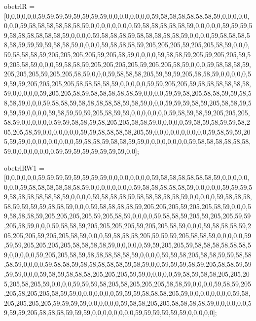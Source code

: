 obetrlR = [0,0,0,0,0,0,59,59,59,59,59,59,59,59,0,0,0,0,0,0,0,0,59,58,58,58,58,58,58,59,0,0,0,0,0,0,0,0,59,58,58,58,58,58,58,59,0,0,0,0,0,0,0,0,59,58,58,58,58,58,59,0,0,0,0,0,59,59,59,59,58,58,58,58,58,58,59,0,0,0,0,59,58,58,58,59,58,58,58,58,58,59,0,0,0,0,59,58,58,58,58,58,59,59,59,59,58,58,59,0,0,0,0,59,58,58,58,59,205,205,205,59,205,205,58,59,0,0,0,59,58,58,58,59,205,205,205,205,59,205,58,59,0,0,0,0,59,58,58,59,205,59,205,205,59,59,205,58,59,0,0,0,59,58,58,59,205,205,205,205,59,205,205,58,59,0,0,0,59,58,58,58,59,205,205,205,59,205,205,58,59,0,0,0,59,58,58,58,205,59,59,59,205,58,58,59,0,0,0,0,0,59,59,59,205,205,205,205,58,58,58,58,59,0,0,0,0,0,59,59,205,205,59,58,58,58,58,58,58,59,0,0,0,0,0,59,205,205,58,59,58,58,58,58,58,59,0,0,0,0,59,59,58,205,58,58,59,59,58,58,58,59,0,0,0,59,58,58,59,58,58,58,58,58,59,58,59,0,0,0,59,59,59,58,59,205,58,58,59,59,59,59,0,0,0,0,59,58,59,59,59,205,58,59,59,0,0,0,0,0,0,0,59,58,59,58,59,205,205,205,58,59,0,0,0,0,0,0,59,59,58,58,59,58,205,205,58,58,59,0,0,0,0,0,59,58,59,58,59,59,58,205,205,58,59,0,0,0,0,0,0,0,59,59,58,58,58,58,205,59,0,0,0,0,0,0,0,0,0,0,59,58,59,59,205,59,59,0,0,0,0,0,0,0,0,0,59,58,58,59,58,58,59,59,0,0,0,0,0,0,0,0,59,58,58,58,58,58,58,59,0,0,0,0,0,0,0,0,59,59,59,59,59,59,59,59,0,0];

obetrlRW1 = [0,0,0,0,0,0,59,59,59,59,59,59,59,59,0,0,0,0,0,0,0,0,59,58,58,58,58,58,58,59,0,0,0,0,0,0,0,0,59,58,58,58,58,58,58,59,0,0,0,0,0,0,0,0,59,58,58,58,58,58,59,0,0,0,0,0,59,59,59,59,58,58,58,58,58,58,59,0,0,0,0,59,58,58,58,59,58,58,58,58,58,59,0,0,0,0,0,59,58,58,58,58,59,59,59,59,58,58,59,0,0,0,59,58,58,58,58,59,205,205,205,59,205,205,58,59,0,0,0,59,58,58,58,59,205,205,205,205,59,205,58,59,0,0,0,0,59,58,58,59,205,59,205,205,59,59,205,58,59,0,0,0,59,58,58,59,205,205,205,205,59,205,205,58,59,0,0,0,59,58,58,58,59,205,205,205,59,205,205,58,59,0,0,0,59,58,58,58,205,59,59,59,205,58,58,59,0,0,0,0,0,59,59,59,205,205,205,205,58,58,58,58,59,0,0,0,0,0,59,59,205,205,59,58,58,58,58,58,58,59,0,0,0,0,0,59,205,205,58,59,58,58,58,58,58,59,0,0,0,0,59,59,58,205,58,58,59,59,58,58,58,59,0,0,0,0,59,58,58,59,58,58,58,58,58,59,58,59,0,0,59,59,59,58,59,205,58,58,59,59,59,59,0,0,0,59,58,59,58,58,58,205,205,205,59,59,0,0,0,0,0,59,58,59,58,58,205,205,205,205,58,205,59,0,0,0,0,59,59,59,58,205,58,205,205,205,58,58,59,0,0,0,0,59,58,59,205,205,58,205,205,58,59,59,0,0,0,0,0,0,0,59,59,59,58,58,58,205,59,0,0,0,0,0,0,0,0,59,58,205,205,205,205,59,59,59,59,0,0,0,0,0,0,59,58,58,205,205,58,58,58,58,59,0,0,0,0,0,0,59,59,59,205,58,58,58,59,59,59,0,0,0,0,0,0,0,0,59,59,59,59,59,59,0,0,0,0,0];

